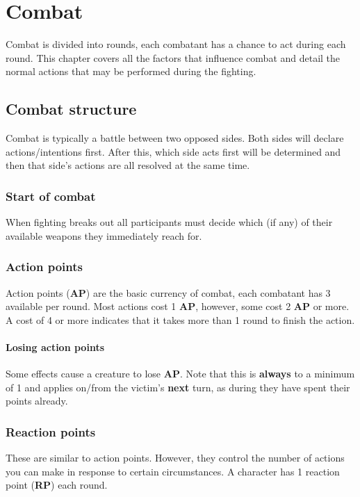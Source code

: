 \documentclass[a4paper,10pt,oneside]{book}
\newcommand{\textlf}[1]{\textbf{\titlecap{#1}}}
\begin{document}
\chapter{Combat}
\label{chap:combat}
Combat is divided into rounds, each combatant has a chance to act during each round. This chapter covers all the factors that influence combat and detail the normal actions that may be performed during the fighting.

\section{Combat structure}
\label{sec:combat-struct}
Combat is typically a battle between two opposed sides. Both sides will declare actions/intentions first. After this, which side acts first will be determined and then that side's actions are all resolved at the same time.  

\subsection{Start of combat}
When fighting breaks out all participants must decide which (if any) of their available weapons they immediately reach for.

\subsection{Action points}
Action points (\textbf{AP}) are the basic currency of combat, each combatant has 3 available per round. Most actions cost 1 \textbf{AP}, however, some cost 2 \textbf{AP} or more. A cost of 4 or more indicates that it takes more than 1 round to finish the action. 

\subsubsection{Losing action points}
Some effects cause a creature to lose \textbf{AP}. Note that this is \textbf{always} to a minimum of 1 and applies on/from the victim's \textbf{next} turn, as during \textlf{action resolution} they have spent their points already.

\subsection{Reaction points}
These are similar to action points. However, they control the number of actions you can make in response to certain circumstances. A character has 1 reaction point (\textbf{RP}) each round.
\end{document}
